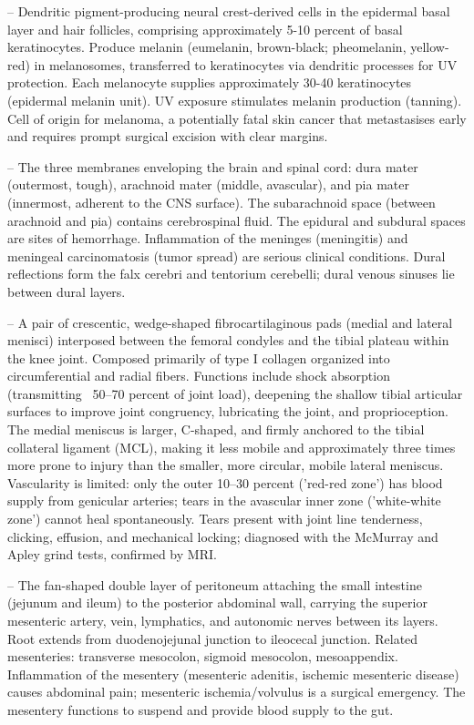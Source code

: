 -- Dendritic pigment-producing neural crest-derived cells in the epidermal basal layer and hair follicles, comprising approximately 5-10 percent of basal keratinocytes. Produce melanin (eumelanin, brown-black; pheomelanin, yellow-red) in melanosomes, transferred to keratinocytes via dendritic processes for UV protection. Each melanocyte supplies approximately 30-40 keratinocytes (epidermal melanin unit). UV exposure stimulates melanin production (tanning). Cell of origin for melanoma, a potentially fatal skin cancer that metastasises early and requires prompt surgical excision with clear margins.

-- The three membranes enveloping the brain and spinal cord: dura mater (outermost, tough), arachnoid mater (middle, avascular), and pia mater (innermost, adherent to the CNS surface). The subarachnoid space (between arachnoid and pia) contains cerebrospinal fluid. The epidural and subdural spaces are sites of hemorrhage. Inflammation of the meninges (meningitis) and meningeal carcinomatosis (tumor spread) are serious clinical conditions. Dural reflections form the falx cerebri and tentorium cerebelli; dural venous sinuses lie between dural layers.

-- A pair of crescentic, wedge-shaped fibrocartilaginous pads (medial and lateral menisci) interposed between the femoral condyles and the tibial plateau within the knee joint. Composed primarily of type I collagen organized into circumferential and radial fibers. Functions include shock absorption (transmitting ~50--70 percent of joint load), deepening the shallow tibial articular surfaces to improve joint congruency, lubricating the joint, and proprioception. The medial meniscus is larger, C-shaped, and firmly anchored to the tibial collateral ligament (MCL), making it less mobile and approximately three times more prone to injury than the smaller, more circular, mobile lateral meniscus. Vascularity is limited: only the outer 10--30 percent ('red-red zone') has blood supply from genicular arteries; tears in the avascular inner zone ('white-white zone') cannot heal spontaneously. Tears present with joint line tenderness, clicking, effusion, and mechanical locking; diagnosed with the McMurray and Apley grind tests, confirmed by MRI.

-- The fan-shaped double layer of peritoneum attaching the small intestine (jejunum and ileum) to the posterior abdominal wall, carrying the superior mesenteric artery, vein, lymphatics, and autonomic nerves between its layers. Root extends from duodenojejunal junction to ileocecal junction. Related mesenteries: transverse mesocolon, sigmoid mesocolon, mesoappendix. Inflammation of the mesentery (mesenteric adenitis, ischemic mesenteric disease) causes abdominal pain; mesenteric ischemia/volvulus is a surgical emergency. The mesentery functions to suspend and provide blood supply to the gut.

